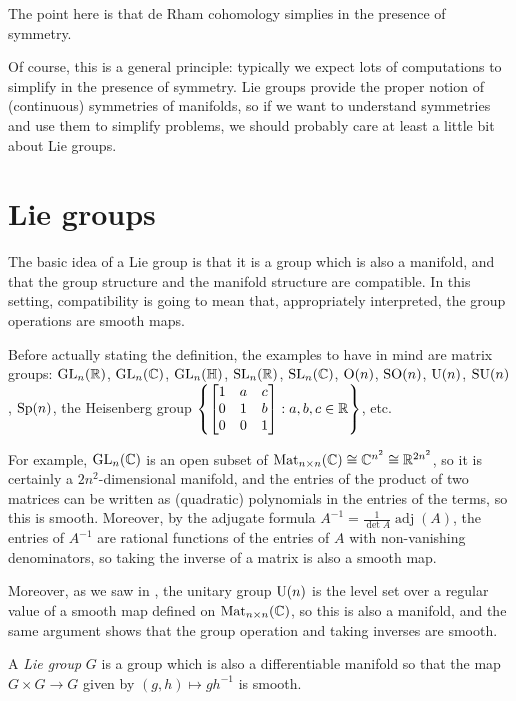 The point here is that de Rham cohomology simplies in the presence of symmetry. 

Of course, this is a general principle: typically we expect lots of computations to simplify in the presence of symmetry. Lie groups provide the proper notion of (continuous) symmetries of manifolds, so if we want to understand symmetries and use them to simplify problems, we should probably care at least a little bit about Lie groups.

\section{Lie groups} 
\label{sec:Lie groups}

The basic idea of a Lie group is that it is a group which is also a manifold, and that the group structure and the manifold structure are compatible. In this setting, compatibility is going to mean that, appropriately interpreted, the group operations are smooth maps.

Before actually stating the definition, the examples to have in mind are matrix groups: $\operatorname{GL}_n(\mathbb{R})$, $\operatorname{GL}_n(\mathbb{C})$, $\operatorname{GL}_n(\mathbb{H})$, $\operatorname{SL}_n(\mathbb{R})$, $\operatorname{SL}_n(\mathbb{C})$, $\operatorname{O}(n)$, $\operatorname{SO}(n)$, $\operatorname{U}(n)$, $\operatorname{SU}(n)$, $\operatorname{Sp}(n)$, the Heisenberg group $\left\{\begin{bmatrix} 1 & a & c \\ 0 & 1 & b \\ 0 & 0 & 1 \end{bmatrix} : a,b,c \in \mathbb{R}\right\}$, etc.

For example, $\operatorname{GL}_n(\mathbb{C})$ is an open subset of $\operatorname{Mat}_{n \times n}(\mathbb{C}) \cong \mathbb{C}^{n^2} \cong \mathbb{R}^{2n^2}$, so it is certainly a $2n^2$-dimensional manifold, and the entries of the product of two matrices can be written as (quadratic) polynomials in the entries of the terms, so this is smooth. Moreover, by the adjugate formula $A^{-1} = \frac{1}{\det A} \operatorname{adj}(A)$, the entries of $A^{-1}$ are rational functions of the entries of $A$ with non-vanishing denominators, so taking the inverse of a matrix is also a smooth map. 

Moreover, as we saw in , the unitary group $\operatorname{U}(n)$ is the level set over a regular value of a smooth map defined on $\operatorname{Mat}_{n \times n}(\mathbb{C})$, so this is also a manifold, and the same argument shows that the group operation and taking inverses are smooth.

\begin{definition}\label{def:Lie group}
	A \emph{Lie group} $G$ is a group which is also a differentiable manifold so that the map $G \times G \to G$ given by $(g,h) \mapsto gh^{-1}$ is smooth.
\end{definition}

